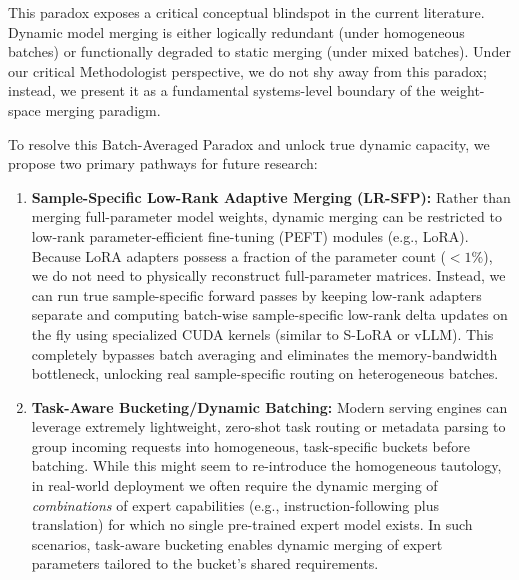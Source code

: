 This paradox exposes a critical conceptual blindspot in the current literature. Dynamic model merging is either logically redundant (under homogeneous batches) or functionally degraded to static merging (under mixed batches). Under our critical Methodologist perspective, we do not shy away from this paradox; instead, we present it as a fundamental systems-level boundary of the weight-space merging paradigm.

To resolve this Batch-Averaged Paradox and unlock true dynamic capacity, we propose two primary pathways for future research:
\begin{enumerate}
    \item \textbf{Sample-Specific Low-Rank Adaptive Merging (LR-SFP):} Rather than merging full-parameter model weights, dynamic merging can be restricted to low-rank parameter-efficient fine-tuning (PEFT) modules (e.g., LoRA). Because LoRA adapters possess a fraction of the parameter count ($< 1\%$), we do not need to physically reconstruct full-parameter matrices. Instead, we can run true sample-specific forward passes by keeping low-rank adapters separate and computing batch-wise sample-specific low-rank delta updates on the fly using specialized CUDA kernels (similar to S-LoRA or vLLM). This completely bypasses batch averaging and eliminates the memory-bandwidth bottleneck, unlocking real sample-specific routing on heterogeneous batches.
    \item \textbf{Task-Aware Bucketing/Dynamic Batching:} Modern serving engines can leverage extremely lightweight, zero-shot task routing or metadata parsing to group incoming requests into homogeneous, task-specific buckets before batching. While this might seem to re-introduce the homogeneous tautology, in real-world deployment we often require the dynamic merging of \emph{combinations} of expert capabilities (e.g., instruction-following plus translation) for which no single pre-trained expert model exists. In such scenarios, task-aware bucketing enables dynamic merging of expert parameters tailored to the bucket's shared requirements.
\end{enumerate}
